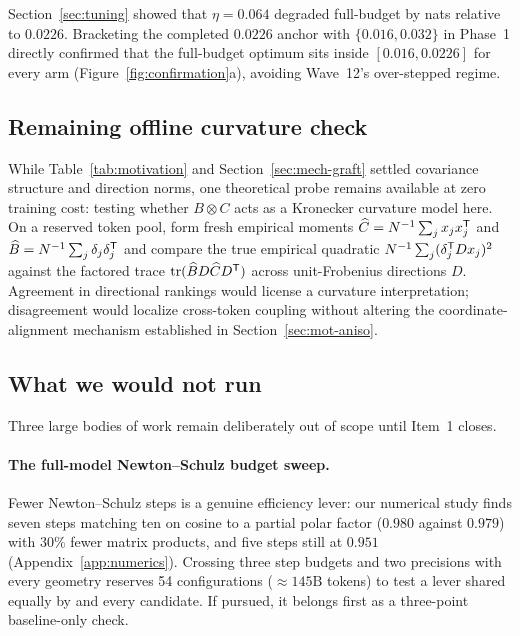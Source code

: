 Section~\ref{sec:tuning} showed that $\eta = 0.064$ degraded full-budget
\muont{} by \waveTwelveMuontSelDiff{} nats relative to $0.0226$. Bracketing the
completed $0.0226$ anchor with $\{0.016, 0.032\}$ in Phase~1 directly confirmed
that the full-budget optimum sits inside $[0.016, 0.0226]$ for every arm
(Figure~\ref{fig:confirmation}a), avoiding Wave~12's over-stepped regime.

\subsection{Remaining offline curvature check}

While Table~\ref{tab:motivation} and Section~\ref{sec:mech-graft} settled
covariance structure and direction norms, one theoretical probe remains available
at zero training cost: testing whether $B \otimes C$ acts as a Kronecker
curvature model here. On a reserved token pool, form fresh empirical moments
$\widehat C = N^{-1}\sum_j x_j x_j^{{\mathsf T}}$ and
$\widehat B = N^{-1}\sum_j \delta_j \delta_j^{{\mathsf T}}$ and compare the true
empirical quadratic $N^{-1}\sum_j (\delta_j^{{\mathsf T}} D x_j)^2$ against the factored
trace $\operatorname{tr}(\widehat B D \widehat C D^{{\mathsf T}})$ across unit-Frobenius directions
$D$. Agreement in directional rankings would license a curvature interpretation;
disagreement would localize cross-token coupling without altering the
coordinate-alignment mechanism established in Section~\ref{sec:mot-aniso}.

\subsection{What we would not run}
\label{sec:nonprogram}

Three large bodies of work remain deliberately out of scope until Item~1 closes.

\paragraph{The full-model Newton--Schulz budget sweep.}
Fewer Newton--Schulz steps is a genuine efficiency lever: our numerical study
finds seven steps matching ten on cosine to a partial polar factor
($0.980$ against $0.979$) with 30\% fewer matrix products, and five steps still
at $0.951$ (Appendix~\ref{app:numerics}). Crossing three step budgets and two
precisions with every geometry reserves 54 configurations ($\approx 145\text{B}$
tokens) to test a lever shared equally by \muont{} and every candidate. If
pursued, it belongs first as a three-point baseline-only check.

